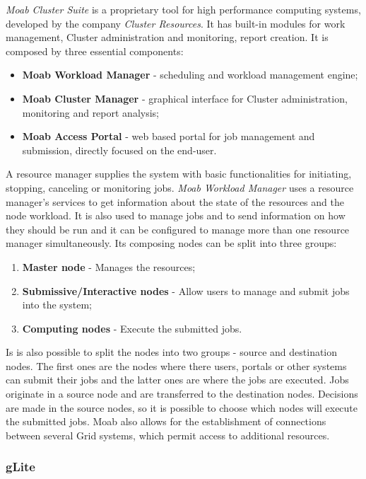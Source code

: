 \textit{Moab Cluster Suite} is a proprietary tool for high performance computing systems, developed by the company \textit{Cluster Resources}. It has built-in modules for work management, Cluster administration and monitoring, report creation. It is composed by three essential components:
\begin{itemize}
\item \textbf{Moab Workload Manager} - scheduling and workload management engine;
\item \textbf{Moab Cluster Manager} - graphical interface for Cluster administration, monitoring and report analysis;
\item \textbf{Moab Access Portal} - web based portal for job management and submission, directly focused on the end-user.
\end{itemize}

A resource manager supplies the system with basic functionalities for initiating, stopping, canceling or monitoring jobs. \textit{Moab Workload Manager} uses a resource manager's services to get information about the state of the resources and the node workload. It is also used to manage jobs and to send information on how they should be run and it can be configured to manage more than one resource manager simultaneously.
Its composing nodes can be split into three groups:
\begin{enumerate}
\item \textbf{Master node} - Manages the resources;
\item \textbf{Submissive/Interactive nodes} - Allow users to manage and submit jobs into the system;
\item \textbf{Computing nodes} - Execute the submitted jobs.
\end{enumerate}

Is is also possible to split the nodes into two groups - source and destination nodes. The first ones are the nodes where there users, portals or other systems can submit their jobs and the latter ones are where the jobs are executed. Jobs originate in a source node and are transferred to the destination nodes. Decisions are made in the source nodes, so it is possible to choose which nodes will execute the submitted jobs.
Moab also allows for the establishment of connections between several Grid systems, which permit access to additional resources.\cite{jorge-ruao, moab}

\subsubsection{gLite}\label{glite}

